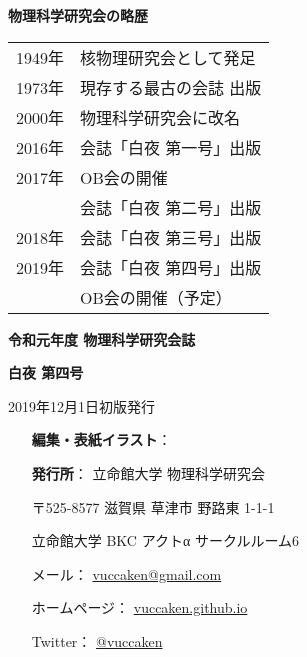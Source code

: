 \documentclass[10pt,b5paper,papersize,dvipdfmx]{jsbook}
\begin{document}

\markboth{}{} %
\clearpage %

\noindent
{\large \bfseries 物理科学研究会の略歴}
\begin{table}[H]
  \begin{tabular}{ll}
    1949年 & 核物理研究会として発足 \\
    1973年 & 現存する最古の会誌 出版 \\
    2000年 & 物理科学研究会に改名   \\
    2016年 & 会誌「白夜 第一号」出版 \\
    2017年 & OB会の開催           \\
          & 会誌「白夜 第二号」出版 \\
    2018年 & 会誌「白夜 第三号」出版 \\
    2019年 & 会誌「白夜 第四号」出版 \\
          & OB会の開催（予定）
  \end{tabular}
\end{table}

\vfill

{\bfseries 令和元年度 物理科学研究会誌}\par
{\large \bfseries 白夜 第四号}\vspace{-1zw}\\
\hrulefill \par
2019年12月1日\hspace{2zw}初版発行\par

\vspace{1.5zw}

\begin{minipage}{0.17\hsize}
    \hspace{1zw}
\end{minipage}
\begin{minipage}{0.6\hsize}
  \begin{itemize}
    \item[{\bfseries 編集・表紙イラスト}：] 
    \item[{\bfseries 発行所}：] 立命館大学 物理科学研究会
    \item[ ] 〒525-8577 滋賀県 草津市 野路東 1-1-1
    \item[ ] 立命館大学 BKC アクトα サークルルーム6
    \item[ ] メール： \url{vuccaken@gmail.com}
    \item[ ] ホームページ： \url{vuccaken.github.io}
    \item[ ] Twitter： \url{@vuccaken}
  \end{itemize}
\end{minipage}

\par \vspace{0.5zw}
\hrulefill \par
\end{document}
